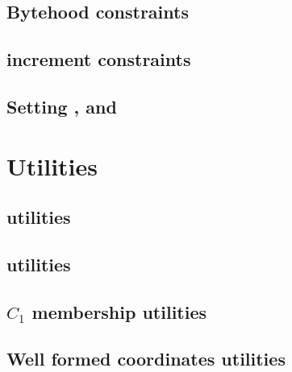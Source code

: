 \subsection{Bytehood constraints}                                           \label{ec data: bytehood and accumulator}                           
\subsection{\ecdataId{} increment constraints}                              \label{ec data: stamp increments}                                   
\subsection{Setting \notOnGTwo{}, \notOnGTwoAcc{} and \notOnGTwoAccMax}     \label{ec data: this point is not on G2 and acc}                    

\section{Utilities}                                                                                                                             
\subsection{\wcpMod{} utilities}                                            \label{ec data: wcp utilities}                                      
\subsection{\extMod{} utilities}                                            \label{ec data: ext utilities}                                      
\subsection{$C_1$ membership utilities}                                     \label{ec data: c1 membership utilities}                            
\subsection{Well formed coordinates utilities}                              \label{ec data: c2 membership maybe utilities}                      

